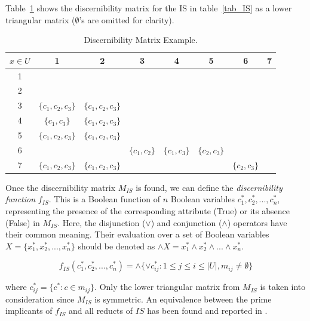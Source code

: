 \documentclass[authoryear,11pt]{elsarticle}
\begin{document}
  Table~\ref{tab_DM} shows the discernibility matrix for the IS in table~\ref{tab_IS} as a lower triangular 
  matrix ($\emptyset$'s are omitted for clarity).
  
   \begin{table}[htb]
		\caption{Discernibility Matrix Example.} \label{tab_DM}
		\centering
 	\begin{tabular}{c|ccccccc}
 		$x \in U$ & 1 & 2 &  3 & 4 & 5 &  6 & 7\\
 		\hline
		1 &&&&&&&\\
		2 &&&&&&&\\
		3 & $\lbrace c_1,c_2,c_3\rbrace$ & $\lbrace c_1,c_2,c_3\rbrace$ &&&&&\\
		4 & $\lbrace c_1,c_3\rbrace$ & $\lbrace c_1,c_2,c_3\rbrace$ &&&&&\\
		5 & $\lbrace c_1,c_2,c_3\rbrace$ & $\lbrace c_1,c_2,c_3\rbrace$ &&&&&\\
		6 &&& $\lbrace c_1,c_2\rbrace$ & $\lbrace c_1,c_3\rbrace$ & $\lbrace c_2,c_3\rbrace$ &&\\
		7 & $\lbrace c_1,c_2,c_3\rbrace$ & $\lbrace c_1,c_2,c_3\rbrace$ &&&& $\lbrace c_2,c_3\rbrace$ &\\
 	\end{tabular}             
 \end{table}
  
  Once the discernibility matrix $M_{IS}$ is found, we can define the \textit{discernibility function} $f_{IS}$.
  This is a Boolean function of $n$ Boolean variables $c_1^*, c_2^*,...,c_n^*$, representing the presence of
  the corresponding attribute (True) or its absence (False) in $M_{IS}$. Here, the disjunction ($\vee$) and 
  conjunction ($\wedge$) operators have their common meaning. Their evaluation over a set of Boolean variables
  $X=\lbrace x_1^*, x_2^*, ..., x_n^* \rbrace$ should be denoted as 
  $\wedge X= x_1^* \wedge x_2^* \wedge ... \wedge x_n^* $.

  \begin{equation}
  	f_{IS}(c_1^*, c_2^*,...,c_n^*)=\wedge \lbrace \vee c_{ij}^* : 1 \leq j \leq i \leq |U|, 
  									m_{ij} \neq \emptyset \rbrace
  \end{equation}

  where $c_{ij}^*=\lbrace c^* : c \in m_{ij} \rbrace$. Only the lower triangular matrix from $M_{IS}$ is
  taken into consideration since $M_{IS}$ is symmetric. An equivalence between the prime implicants of
  $f_{IS}$ and all reducts of $IS$ has been found and reported in \citep{Pawlak07}.
  
\end{document}
